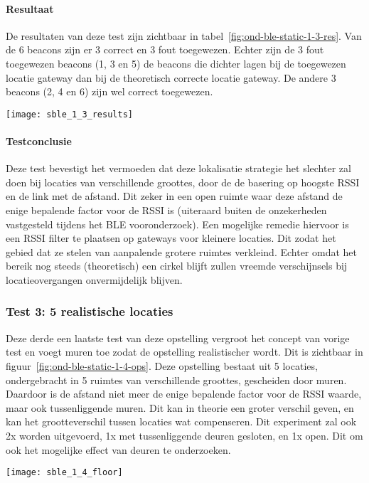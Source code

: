 \paragraph{Resultaat}
\begin{minipage}{0.55\textwidth}
De resultaten van deze test zijn zichtbaar in tabel~\ref{fig:ond-ble-static-1-3-res}. Van de 6 beacons zijn er 3 correct en 3 fout toegewezen. Echter zijn de 3 fout toegewezen beacons (1, 3 en 5) de beacons die dichter lagen bij de toegewezen locatie gateway dan bij de theoretisch correcte locatie gateway. De andere 3 beacons (2, 4 en 6) zijn wel correct toegewezen. 
\end{minipage}
\hfill
\begin{minipage}{0.42\textwidth}
	\texttt{[image: sble\_1\_3\_results]}
	\label{fig:ond-ble-static-1-3-res}
\end{minipage}

\paragraph{Testconclusie}
Deze test bevestigt het vermoeden dat deze lokalisatie strategie het slechter zal doen bij locaties van verschillende groottes, door de de basering op hoogste RSSI en de link met de afstand. Dit zeker in een open ruimte waar deze afstand de enige bepalende factor voor de RSSI is (uiteraard buiten de onzekerheden vastgesteld tijdens het BLE vooronderzoek). Een mogelijke remedie hiervoor is een RSSI filter te plaatsen op gateways voor kleinere locaties. Dit zodat het gebied dat ze stelen van aanpalende grotere ruimtes verkleind. Echter omdat het bereik nog steeds (theoretisch) een cirkel blijft zullen vreemde verschijnsels bij locatieovergangen onvermijdelijk blijven.

\subsubsection{Test 3: 5 realistische locaties}
\label{sec:ond-ble-1-3}
\begin{minipage}{0.55\textwidth}
Deze derde een laatste test van deze opstelling vergroot het concept van vorige test en voegt muren toe zodat de opstelling realistischer wordt. Dit is zichtbaar in figuur~\ref{fig:ond-ble-static-1-4-ops}. Deze opstelling bestaat uit 5 locaties, ondergebracht in 5 ruimtes van verschillende groottes, gescheiden door muren. Daardoor is de afstand niet meer de enige bepalende factor voor de RSSI waarde, maar ook tussenliggende muren. Dit kan in theorie een groter verschil geven, en kan het grootteverschil tussen locaties wat compenseren. Dit experiment zal ook 2x worden uitgevoerd, 1x met tussenliggende deuren gesloten, en 1x open. Dit om ook het mogelijke effect van deuren te onderzoeken.
\end{minipage}
\hfill
\begin{minipage}{0.42\textwidth}
	\texttt{[image: sble\_1\_4\_floor]}
	\label{fig:ond-ble-static-1-4-ops}
\end{minipage}

